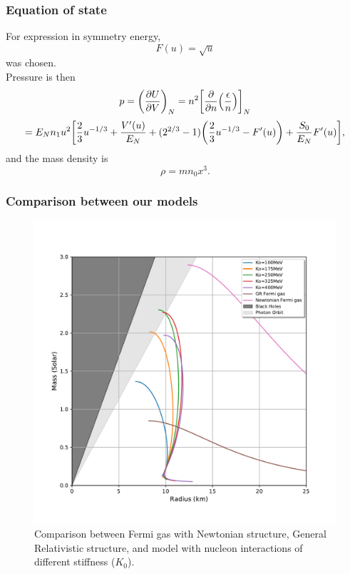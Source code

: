 \documentclass[hperref={pdfpagelabels=false}]{beamer}
\begin{document}
\begin{frame}
\frametitle{Equation of state}
 For expression in symmetry energy,
 \[F(u)=\sqrt{u}\]
 was chosen.\\
 Pressure is then 
 \[p=\qty(\pdv{U}{V})_{N}=n^{2}\qty[\pdv{n}(\frac{\epsilon}{n})]_{N}\]
 \[=E_{N}n_{1}u^{2}\qty[\frac{2}{3}u^{-1/3}+\frac{V'(u)}{E_{N}}+(2^{2/3}-1)\qty(\frac{2}{3}u^{-1/3}-F'(u))+\frac{S_{0}}{E_{N}}F'(u)],\]
 and the mass density is
 \[\rho=mn_{0}x^{3}.\]
\end{frame}

\begin{frame}
 \frametitle{Comparison between our models}
 \begin{figure}
    \includegraphics[scale=0.3]{eos_compare_our_model.pdf}
    \caption{Comparison between Fermi gas with Newtonian structure, General Relativistic structure, and model with nucleon interactions of different stiffness ($K_{0}$).}\label{fig/ourmodel}
  \end{figure}
\end{frame}
\end{document}
